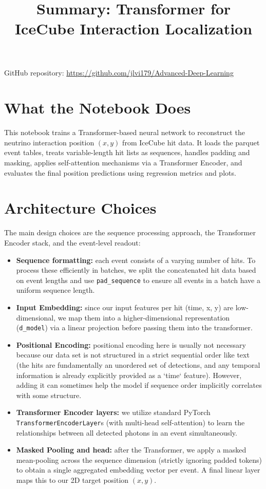 \documentclass[11pt,a4paper]{article}
\title{Summary: Transformer for IceCube Interaction Localization}
\author{}
\date{}
\begin{document}
\maketitle

\noindent GitHub repository: \href{https://github.com/jlvi179/Advanced-Deep-Learning}{https://github.com/jlvi179/Advanced-Deep-Learning}

\section*{What the Notebook Does}

This notebook trains a Transformer-based neural network to reconstruct the neutrino interaction position $(x,y)$ from IceCube hit data. It loads the parquet event tables, treats variable-length hit lists as sequences, handles padding and masking, applies self-attention mechanisms via a Transformer Encoder, and evaluates the final position predictions using regression metrics and plots.

\section*{Architecture Choices}

The main design choices are the sequence processing approach, the Transformer Encoder stack, and the event-level readout:

\begin{itemize}
    \item \textbf{Sequence formatting:} each event consists of a varying number of hits. To process these efficiently in batches, we split the concatenated hit data based on event lengths and use \texttt{pad\_sequence} to ensure all events in a batch have a uniform sequence length.
    \item \textbf{Input Embedding:} since our input features per hit (time, x, y) are low-dimensional, we map them into a higher-dimensional representation (\texttt{d\_model}) via a linear projection before passing them into the transformer.
    \item \textbf{Positional Encoding:} positional encoding here is usually not necessary because our data set is not structured in a strict sequential order like text (the hits are fundamentally an unordered set of detections, and any temporal information is already explicitly provided as a `time` feature). However, adding it can sometimes help the model if sequence order implicitly correlates with some structure.
    \item \textbf{Transformer Encoder layers:} we utilize standard PyTorch \texttt{TransformerEncoderLayer}s (with multi-head self-attention) to learn the relationships between all detected photons in an event simultaneously.
    \item \textbf{Masked Pooling and head:} after the Transformer, we apply a masked mean-pooling across the sequence dimension (strictly ignoring padded tokens) to obtain a single aggregated embedding vector per event. A final linear layer maps this to our 2D target position $(x, y)$.
\end{itemize}
\end{document}
